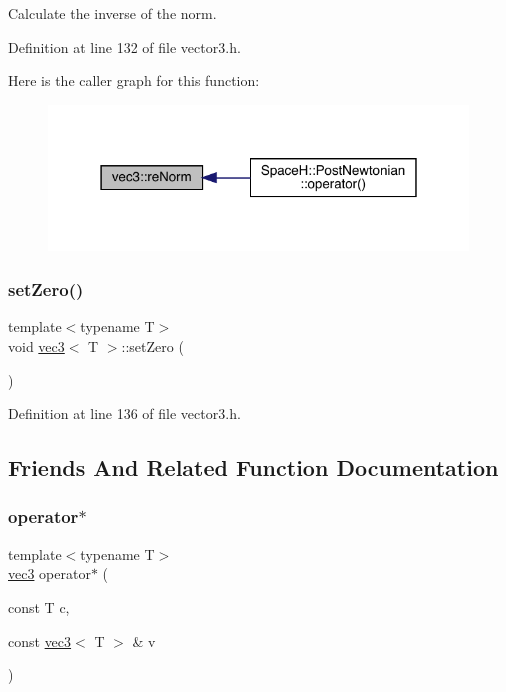 Calculate the inverse of the norm. 



Definition at line 132 of file vector3.\+h.

Here is the caller graph for this function\+:\nopagebreak
\begin{figure}[H]
\begin{center}
\leavevmode
\includegraphics[width=316pt]{structvec3_a8539e3e4fbf555f6bd464fdc75fdfd56_icgraph}
\end{center}
\end{figure}
\mbox{\label{structvec3_a4bfe30989d83b8f3b5b3d2177f804360}} 
\subsubsection{\texorpdfstring{set\+Zero()}{setZero()}}
{\footnotesize\ttfamily template$<$typename T$>$ \\
void \mbox{\hyperlink{structvec3}{vec3}}$<$ T $>$\+::set\+Zero (\begin{DoxyParamCaption}{ }\end{DoxyParamCaption})\hspace{0.3cm}{\ttfamily [inline]}}



Definition at line 136 of file vector3.\+h.



\subsection{Friends And Related Function Documentation}
\mbox{\label{structvec3_a4f0b2685679a321b6c43a7406719c3a5}} 
\subsubsection{\texorpdfstring{operator$\ast$}{operator*}}
{\footnotesize\ttfamily template$<$typename T$>$ \\
\mbox{\hyperlink{structvec3}{vec3}} operator$\ast$ (\begin{DoxyParamCaption}\item[{const T}]{c,  }\item[{const \mbox{\hyperlink{structvec3}{vec3}}$<$ T $>$ \&}]{v }\end{DoxyParamCaption})\hspace{0.3cm}{\ttfamily [friend]}}



